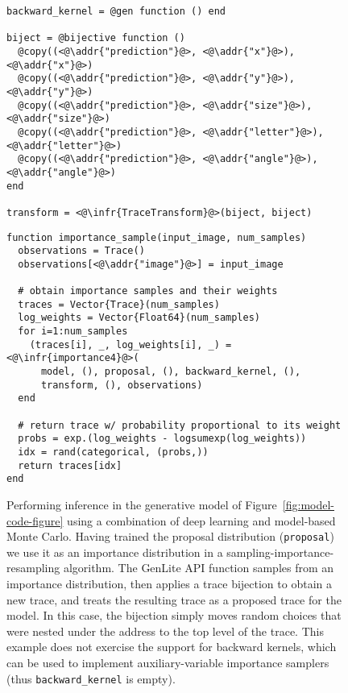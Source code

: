 \begin{figure}[t]
\begin{minipage}[t]{0.45\textwidth}
\begin{lstlisting}
backward_kernel = @gen function () end

biject = @bijective function ()
  @copy((<@\addr{"prediction"}@>, <@\addr{"x"}@>), <@\addr{"x"}@>)
  @copy((<@\addr{"prediction"}@>, <@\addr{"y"}@>), <@\addr{"y"}@>)
  @copy((<@\addr{"prediction"}@>, <@\addr{"size"}@>), <@\addr{"size"}@>)
  @copy((<@\addr{"prediction"}@>, <@\addr{"letter"}@>), <@\addr{"letter"}@>)
  @copy((<@\addr{"prediction"}@>, <@\addr{"angle"}@>), <@\addr{"angle"}@>)
end

transform = <@\infr{TraceTransform}@>(biject, biject)
\end{lstlisting}
\end{minipage}
\begin{minipage}[t]{0.55\textwidth}
\begin{lstlisting}
function importance_sample(input_image, num_samples)
  observations = Trace()
  observations[<@\addr{"image"}@>] = input_image

  # obtain importance samples and their weights
  traces = Vector{Trace}(num_samples)
  log_weights = Vector{Float64}(num_samples)
  for i=1:num_samples
    (traces[i], _, log_weights[i], _) = <@\infr{importance4}@>(
      model, (), proposal, (), backward_kernel, (),
      transform, (), observations)
  end

  # return trace w/ probability proportional to its weight
  probs = exp.(log_weights - logsumexp(log_weights))
  idx = rand(categorical, (probs,))
  return traces[idx]
end
\end{lstlisting}
\end{minipage}
\caption{
Performing inference in the generative model of Figure~\ref{fig:model-code-figure} using a combination of deep learning and model-based Monte Carlo.
Having trained the proposal distribution (\texttt{proposal}) we use it as an importance distribution in a sampling-importance-resampling algorithm.
The GenLite API function  samples from an importance distribution, then applies a trace bijection to obtain a new trace, and treats the resulting trace as a proposed trace for the model.
In this case, the bijection simply moves random choices that were nested under the address  to the top level of the trace.
This example does not exercise the support for backward kernels, which can be used to implement auxiliary-variable importance samplers (thus \texttt{backward\_kernel} is empty).
}
\label{fig:inference-code-figure}
\end{figure}
